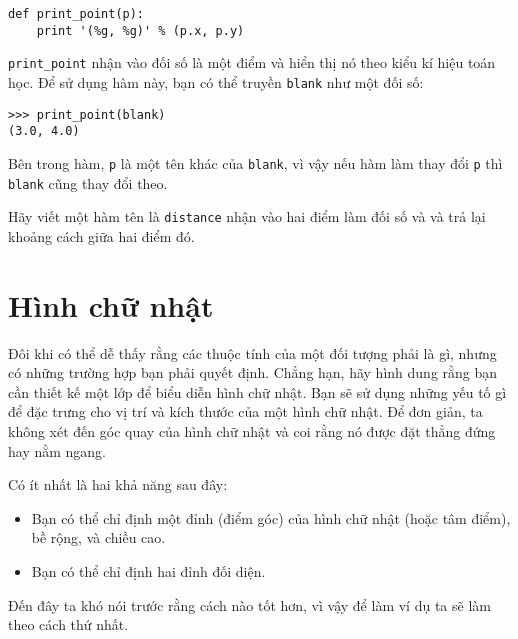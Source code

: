 \documentclass[11pt]{book}
\begin{document}

\beforeverb
\begin{verbatim}
def print_point(p):
    print '(%g, %g)' % (p.x, p.y)
\end{verbatim}
\afterverb
%
\verb"print_point" nhận vào đối số là một điểm và hiển thị nó theo kiểu kí hiệu toán học.
Để sử dụng hàm này, bạn có thể truyền {\tt blank} như một đối số:

\beforeverb
\begin{verbatim}
>>> print_point(blank)
(3.0, 4.0)
\end{verbatim}
\afterverb
%
Bên trong hàm, {\tt p} là một tên khác của {\tt blank}, vì vậy nếu
hàm làm thay đổi {\tt p} thì {\tt blank} cũng thay đổi theo.



\begin{ex}
Hãy viết một hàm tên là {\tt distance} nhận vào hai điểm làm đối số
và và trả lại khoảng cách giữa hai điểm đó.
\end{ex}



\section{Hình chữ nhật}

Đôi khi có thể dễ thấy rằng các thuộc tính của một đối tượng phải là gì,
nhưng có những trường hợp bạn phải quyết định. Chẳng hạn, hãy hình dung
rằng bạn cần thiết kế một lớp để biểu diễn hình chữ nhật. Bạn sẽ sử dụng
những yếu tố gì để đặc trưng cho vị trí và kích thước của một hình chữ nhật.
Để đơn giản, ta không xét đến góc quay của hình chữ nhật và coi rằng
nó được đặt thẳng đứng hay nằm ngang.


Có ít nhất là hai khả năng sau đây: 

\begin{itemize}

\item Bạn có thể chỉ định một đỉnh (điểm góc) của hình chữ nhật (hoặc tâm điểm),
bề rộng, và chiều cao.

\item Bạn có thể chỉ định hai đỉnh đối diện.

\end{itemize}

Đến đây ta khó nói trước rằng cách nào tốt hơn, vì vậy để làm ví dụ
ta sẽ làm theo cách thứ nhất.
\end{document}
